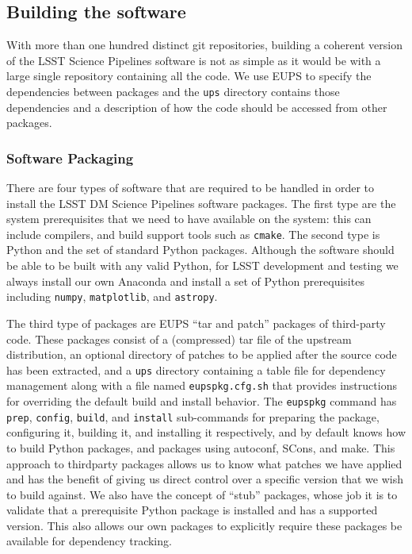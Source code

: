 \subsection{Building the software}

With more than one hundred distinct git repositories, building a coherent version of the LSST Science Pipelines software is not as simple as it would be with a large single repository containing all the code.
We use EUPS to specify the dependencies between packages and the \texttt{ups} directory contains those dependencies and a description of how the code should be accessed from other packages.

\subsubsection{Software Packaging}

There are four types of software that are required to be handled in order to install the LSST DM Science Pipelines software packages.
The first type are the system prerequisites that we need to have available on the system: this can include compilers, and build support tools such as \texttt{cmake}.
The second type is Python and the set of standard Python packages.
Although the software should be able to be built with any valid Python, for LSST development and testing we always install our own Anaconda and install a set of Python prerequisites including \texttt{numpy}, \texttt{matplotlib}, and \texttt{astropy}\cite{2018arXiv180102634T}.

The third type of packages are EUPS ``tar and patch'' packages of third-party code.
These packages consist of a (compressed) tar file of the upstream distribution, an optional directory of patches to be applied after the source code has been extracted, and a \texttt{ups} directory containing a table file for dependency management along with a file named \texttt{eupspkg.cfg.sh} that provides instructions for overriding the default build and install behavior.
The \texttt{eupspkg} command has \texttt{prep}, \texttt{config}, \texttt{build}, and \texttt{install} sub-commands for preparing the package, configuring it, building it, and installing it respectively, and by default knows how to build Python packages, and packages using autoconf, SCons, and make.
This approach to thirdparty packages allows us to know what patches we have applied and has the benefit of giving us direct control over a specific version that we wish to build against.
We also have the concept of ``stub'' packages, whose job it is to validate that a prerequisite Python package is installed and has a supported version.
This also allows our own packages to explicitly require these packages be available for dependency tracking.

